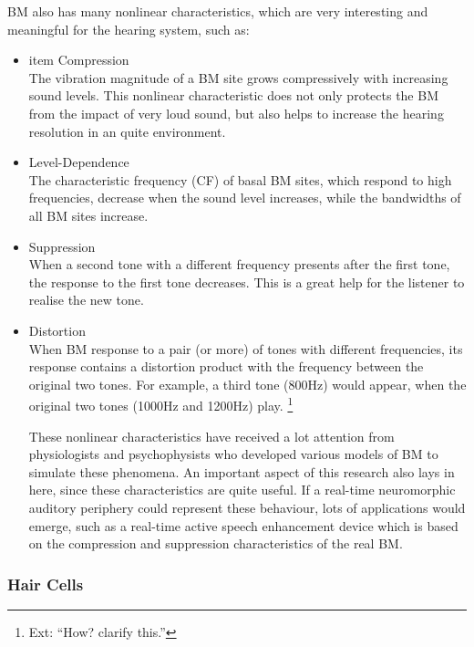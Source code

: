 \documentclass[11pt]{article}
\begin{document}
BM also has many nonlinear characteristics, which are very
interesting and meaningful for the hearing system, such as:
\begin{itemize}

\item item Compression\\
\label{sec-2-3-1-1}%
The vibration magnitude of a BM site grows compressively with
increasing sound levels. This nonlinear characteristic does not only
protects the BM from the impact of very loud sound, but also helps
to increase the hearing resolution in an quite environment.


\item Level-Dependence\\
\label{sec-2-3-1-2}%
The characteristic frequency (CF) of basal BM sites, which respond to
high frequencies, decrease when the sound level increases, while the
bandwidths of all BM sites increase.


\item Suppression\\
\label{sec-2-3-1-3}%
When a second tone with a different frequency presents after the
first tone, the response to the first tone decreases. This is a
great help for the listener to realise the new tone.


\item Distortion\\
\label{sec-2-3-1-4}%
When BM response to a pair (or more) of tones with different
frequencies, its response contains a distortion product with the
frequency between the original two tones. For example, a third tone
(800Hz) would appear, when the original two tones (1000Hz and
1200Hz) play. \footnote{Ext: ``How? clarify this.'' }

These nonlinear characteristics have received a lot attention from
physiologists and psychophysists who developed various models of
BM to simulate these phenomena. An important aspect of this research
also lays in here, since these characteristics are quite useful. If a
real-time neuromorphic auditory periphery could represent these
behaviour, lots of applications  would emerge, such as a real-time
active speech enhancement device which is based on the compression and
suppression characteristics of the real BM.

\end{itemize} %
\subsubsection{Hair Cells}
\label{sec-2-3-2}
\label{sec:ch2-hair-cells}
\end{document}
